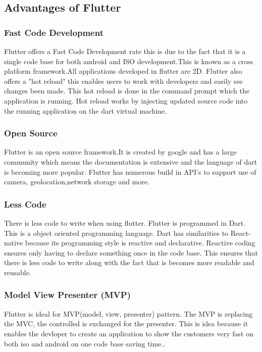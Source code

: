 \subsection{Advantages of Flutter}

\subsubsection{Fast Code Development}
Flutter offers a Fast Code Development rate this is due to the fact that it is a single code base for both android and ISO development.This is known as a cross platform framework.All applications developed in flutter are 2D. Flutter also offers a "hot reload" this enables users to work with developers and easily see changes been made. This hot reload is done in the command prompt which the application is running. Hot reload works by injecting updated source code into the running application on the dart virtual machine.\cite{faq_2019}
\subsubsection{Open Source}
Flutter is an open source framework.It is created by google and has a large community which means the documentation is extensive and the language of dart is becoming more popular. Flutter has numerous build in API's to support use of camera, geolocation,network storage and more.\cite{pros_cons}
\subsubsection{Less Code}
There is less code to write when using flutter. Flutter is programmed in Dart. This is a object oriented programming language. Dart has similarities to React-native because its programming style is reactive and declarative.\cite{pros_cons} Reactive coding ensures only having to declare something once in the code base. This ensures that there is less code to write along with the fact that is becomes more readable and reusable.\cite{depth_flutter_2019}
\subsubsection{Model View Presenter (MVP)}
Flutter is ideal for MVP(model, view, presenter) pattern. The MVP is replacing the MVC, the controlled is exchanged for the presenter. This is idea because it enables the devloper to create an application to show the customers very fast on both iso and android on one code base saving time.\cite{pros_cons}.

